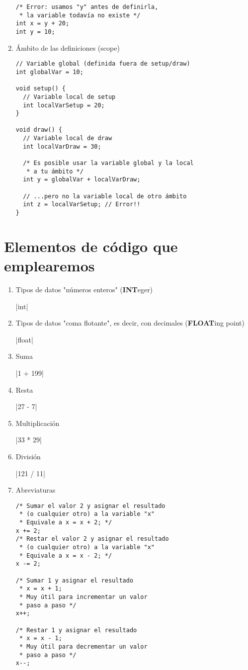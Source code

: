 \documentclass[a4paper,oneside]{article}
\begin{document}
\begin{enumerate}
    \begin{verbatim}
/* Error: usamos "y" antes de definirla,
 * la variable todavía no existe */
int x = y + 20;
int y = 10;
    \end{verbatim}

  \item Ámbito de las definiciones (scope)

    \begin{verbatim}
// Variable global (definida fuera de setup/draw)
int globalVar = 10;

void setup() {
  // Variable local de setup
  int localVarSetup = 20;
}

void draw() {
  // Variable local de draw
  int localVarDraw = 30;

  /* Es posible usar la variable global y la local
   * a tu ámbito */
  int y = globalVar + localVarDraw;

  // ...pero no la variable local de otro ámbito
  int z = localVarSetup; // Error!!
}
    \end{verbatim}

\end{enumerate}


\newpage
\section{Elementos de código que emplearemos}
\begin{enumerate}
  \item Tipos de datos "números enteros" (\textbf{INT}eger)

     |int|
  \item Tipos de datos "coma flotante", es decir, con decimales (\textbf{FLOAT}ing point)

     |float|
  \item Suma

     |1 + 199|
  \item Resta

     |27 - 7|
  \item Multiplicación

     |33 * 29|
  \item División

     |121 / 11|
  \item Abreviaturas

    \begin{verbatim}
/* Sumar el valor 2 y asignar el resultado
 * (o cualquier otro) a la variable "x"
 * Equivale a x = x + 2; */
x += 2;
/* Restar el valor 2 y asignar el resultado
 * (o cualquier otro) a la variable "x"
 * Equivale a x = x - 2; */
x -= 2;

/* Sumar 1 y asignar el resultado
 * x = x + 1;
 * Muy útil para incrementar un valor
 * paso a paso */
x++;

/* Restar 1 y asignar el resultado
 * x = x - 1;
 * Muy útil para decrementar un valor
 * paso a paso */
x--;
    \end{verbatim}
\end{enumerate}
\end{document}
